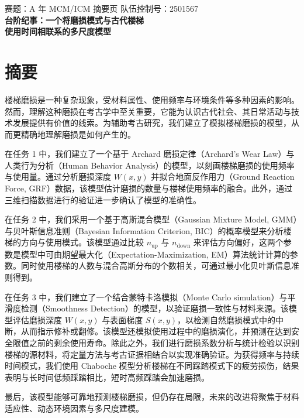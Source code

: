 \documentclass[11pt,a4paper]{ctexart}
\newcommand{\cfgup}{\mathrm{up}}
\newcommand{\cfgdown}{\mathrm{down}}
\begin{document}
\thispagestyle{empty}
\begin{center}
{\small 赛题：A  年 MCM/ICM \qquad 摘要页 \qquad 队伍控制号：2501567}\\[1.2em]
{\LARGE\bfseries 台阶纪事：一个将磨损模式与古代楼梯\\[0.3em]使用时间相联系的多尺度模型}\\[1.2em]
\end{center}

\section*{摘要}

楼梯磨损是一种复杂现象，受材料属性、使用频率与环境条件等多种因素的影响。然而，理解这种磨损在考古学中至关重要，它能为认识古代社会、其日常活动与技术发展提供有价值的线索。为辅助考古研究，我们建立了模拟楼梯磨损的模型，从而更精确地理解磨损是如何产生的。

在任务 1 中，我们建立了一个基于 Archard 磨损定律（Archard's Wear Law）与人类行为分析（Human Behavior Analysis）的模型，以刻画楼梯磨损的使用频率与使用量。通过分析磨损深度 $W(x,y)$ 并拟合地面反作用力（Ground Reaction Force, GRF）数据，该模型估计磨损的数量与楼梯使用频率的融合。此外，通过三维扫描数据进行的验证进一步确认了模型的准确性。

在任务 2 中，我们采用一个基于高斯混合模型（Gaussian Mixture Model, GMM）与贝叶斯信息准则（Bayesian Information Criterion, BIC）的概率模型来分析楼梯的方向与使用模式。该模型通过比较 $n_{\cfgup}$ 与 $n_{\cfgdown}$ 来评估方向偏好，这两个参数是模型中可由期望最大化（Expectation-Maximization, EM）算法统计计算的参数。同时使用楼梯的人数与混合高斯分布的个数相关，可通过最小化贝叶斯信息准则得到。

在任务 3 中，我们建立了一个结合蒙特卡洛模拟（Monte Carlo simulation）与平滑度检测（Smoothness Detection）的模型，以验证磨损一致性与材料来源。该模型评估磨损深度 $W(x,y)$ 与表面梯度 $S(x,y)$，以检测自然磨损模式中的中断，从而指示修补或翻修。该模型还模拟使用过程中的磨损演化，并预测在达到安全限值之前的剩余使用寿命。除此之外，我们进行磨损系数分析与统计检验以识别楼梯的源材料，将定量方法与考古证据相结合以实现准确验证。为获得频率与持续时间模式，我们使用 Chaboche 模型分析楼梯在不同踩踏模式下的疲劳损伤，结果表明与长时间低频踩踏相比，短时高频踩踏会加速磨损。

最后，该模型能够可靠地预测楼梯磨损，但仍存在局限，未来的改进将聚焦于材料适应性、动态环境因素与多尺度建模。
\end{document}
